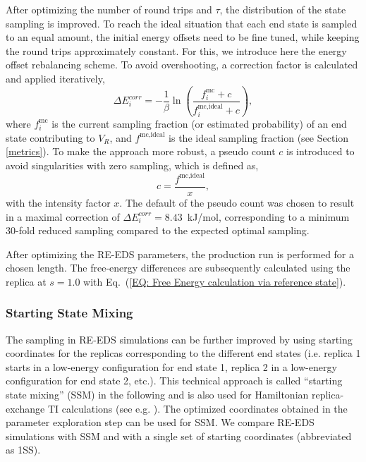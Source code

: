 After optimizing the number of round trips and $\tau$, the distribution of the state sampling is improved. To reach the ideal situation that each end state is sampled to an equal amount, the initial energy offsets need to be fine tuned, while keeping the round trips approximately constant. For this, we introduce here the energy offset rebalancing scheme.
To avoid overshooting, a correction factor is calculated and applied iteratively,
\begin{equation}
    \Delta E^{corr}_i = - \frac{1}{\beta} \ln \left( \frac{f_i^{\text{mc}}+c}{f^{\text{mc,ideal}}_{i}+c} \right),
    \label{eq: EoffRebalancing}
\end{equation}
where $f_i^{\text{mc}}$ is the current sampling fraction (or estimated probability) of an end state contributing to $V_R $, and $f^{\text{mc,ideal}}$ is the ideal sampling fraction (see Section \ref{metrics}). 
%
To make the approach more robust, a pseudo count $c$ is introduced to avoid singularities with zero sampling, which is defined as,
\begin{equation}
    c = \frac{f^{\text{mc,ideal}}}{x},
    \label{eq: EoffRebalancingPseudoCount}
\end{equation}
with the intensity factor $x$.
The default of the pseudo count was chosen to result in a maximal correction of $\Delta E^{corr}_i=8.43$~kJ/mol, corresponding to a minimum 30-fold reduced sampling compared to the expected optimal sampling.

After optimizing the RE-EDS parameters, the production run is performed for a chosen length. 
The free-energy differences are subsequently calculated using the replica at $s=1.0$ with Eq.~(\ref{EQ: Free Energy calculation via reference state}).

\subsubsection{Starting State Mixing}
The sampling in RE-EDS simulations can be further improved by using starting coordinates for the replicas corresponding to the different end states (i.e. replica 1 starts in a low-energy configuration for end state 1, replica 2 in a low-energy configuration for end state 2, etc.). This technical approach is called ``starting state mixing'' (SSM) in the following and is also used for Hamiltonian replica-exchange TI calculations (see e.g. \cite{Graf2016, Hahn2020}). The optimized coordinates obtained in the parameter exploration step can be used for SSM. We compare RE-EDS simulations with SSM and with a single set of starting coordinates (abbreviated as 1SS).  

